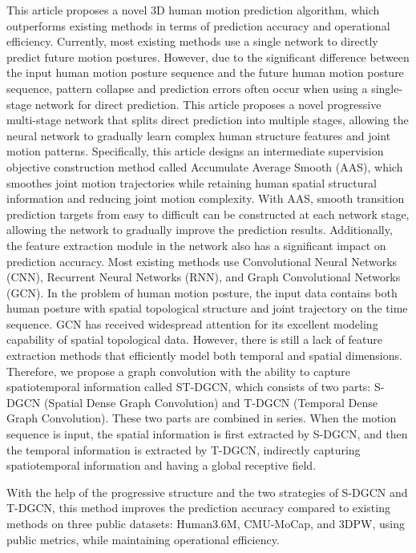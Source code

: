 This article proposes a novel 3D human motion prediction algorithm, which outperforms existing methods in terms of prediction accuracy and operational efficiency. Currently, most existing methods use a single network to directly predict future motion postures. However, due to the significant difference between the input human motion posture sequence and the future human motion posture sequence, pattern collapse and prediction errors often occur when using a single-stage network for direct prediction. This article proposes a novel progressive multi-stage network that splits direct prediction into multiple stages, allowing the neural network to gradually learn complex human structure features and joint motion patterns. Specifically, this article designs an intermediate supervision objective construction method called Accumulate Average Smooth (AAS), which smoothes joint motion trajectories while retaining human spatial structural information and reducing joint motion complexity. With AAS, smooth transition prediction targets from easy to difficult can be constructed at each network stage, allowing the network to gradually improve the prediction results. Additionally, the feature extraction module in the network also has a significant impact on prediction accuracy. Most existing methods use Convolutional Neural Networks (CNN), Recurrent Neural Networks (RNN), and Graph Convolutional Networks (GCN). In the problem of human motion posture, the input data contains both human posture with spatial topological structure and joint trajectory on the time sequence. GCN has received widespread attention for its excellent modeling capability of spatial topological data. However, there is still a lack of feature extraction methods that efficiently model both temporal and spatial dimensions. Therefore, we propose a graph convolution with the ability to capture spatiotemporal information called ST-DGCN, which consists of two parts: S-DGCN (Spatial Dense Graph Convolution) and T-DGCN (Temporal Dense Graph Convolution). These two parts are combined in series. When the motion sequence is input, the spatial information is first extracted by S-DGCN, and then the temporal information is extracted by T-DGCN, indirectly capturing spatiotemporal information and having a global receptive field.

With the help of the progressive structure and the two strategies of S-DGCN and T-DGCN, this method improves the prediction accuracy compared to existing methods on three public datasets: Human3.6M, CMU-MoCap, and 3DPW, using public metrics, while maintaining operational efficiency.

